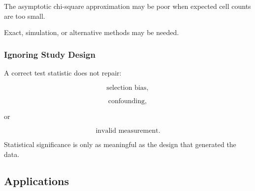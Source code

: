 The asymptotic chi-square approximation may be poor when expected cell
counts are too small.

Exact, simulation, or alternative methods may be needed.

\subsubsection{Ignoring Study Design}

A correct test statistic does not repair:

\[
\boxed{
\text{selection bias},
}
\]

\[
\boxed{
\text{confounding},
}
\]

or

\[
\boxed{
\text{invalid measurement}.
}
\]

Statistical significance is only as meaningful as the design that
generated the data.

\subsection{Applications}
\label{subsec:hypothesis-testing-applications}

